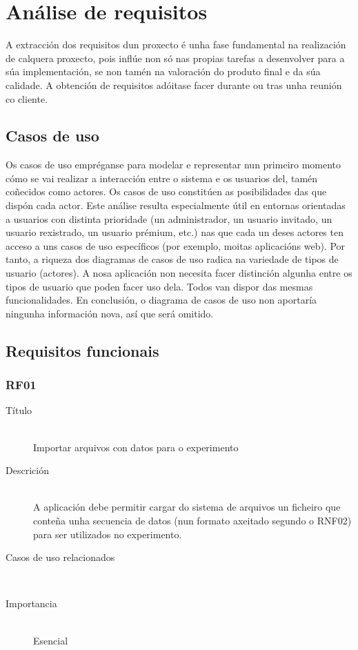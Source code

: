 \chapter{Análise de requisitos}

A extracción dos requisitos dun proxecto é unha fase fundamental na realización de calquera proxecto, pois inflúe non só nas propias tarefas a desenvolver para a súa implementación, se non tamén na valoración do produto final e da súa calidade. A obtención de requisitos adóitase facer durante ou tras unha reunión co cliente.

\section{Casos de uso}

Os casos de uso empréganse para modelar e representar nun primeiro momento cómo se vai realizar a interacción entre o sistema e os usuarios del, tamén coñecidos como actores. Os casos de uso constitúen as posibilidades das que dispón cada actor. Este análise resulta especialmente útil en entornas orientadas a usuarios con distinta prioridade (un administrador, un usuario invitado, un usuario rexistrado, un usuario prémium, etc.) nas que cada un deses actores ten acceso a uns casos de uso específicos (por exemplo, moitas aplicacións web). Por tanto, a riqueza dos diagramas de casos de uso radica na variedade de tipos de usuario (actores). A nosa aplicación non necesita facer distinción algunha entre os tipos de usuario que poden facer uso dela. Todos van dispor das mesmas funcionalidades. En conclusión, o diagrama de casos de uso non aportaría ningunha información nova, así que será omitido.

\section{Requisitos funcionais}

\subsection*{RF01}
\begin{description}
\item[Título] \hfill \\
Importar arquivos con datos para o experimento
\item[Descrición] \hfill \\
A aplicación debe permitir cargar do sistema de arquivos un ficheiro que conteña unha secuencia de datos (nun formato axeitado segundo o RNF02) para ser utilizados no experimento.
\item[Casos de uso relacionados] \hfill \\
\item[Importancia] \hfill \\
Esencial
\end{description}

